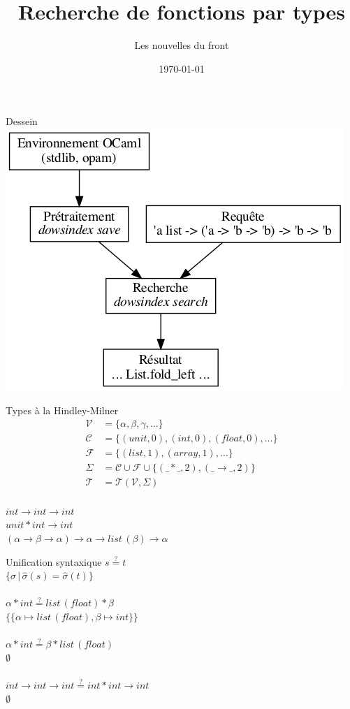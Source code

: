 \documentclass[serif]{beamer}
\title{Recherche de fonctions par types}
\subtitle{Les nouvelles du front}
\date{\today}
\newcommand{\?}{\stackrel{?}{=}}
\begin{document}
\begin{frame}
	\titlepage
\end{frame}


\begin{frame}{Dessein}
	\includegraphics[scale=0.5,center]{graphs/dessein}
\end{frame}


\begin{frame}{Types à la Hindley-Milner}
	\centering
	\large
	\begin{align*}
		\mathscr V &= \{ \alpha, \beta, \gamma, \dots \} \\
		\mathscr C &= \{ (unit, 0), (int, 0), (float, 0), \dots \} \\
		\mathscr F &= \{ (list, 1), (array, 1), \dots \} \\
		\Sigma &= \mathscr C \cup \mathscr F \cup \{ (\_\!*\!\_, 2), (\_\!\rightarrow\!\_, 2) \} \\
		\mathscr T &= \mathscr T (\mathscr V, \Sigma)
	\end{align*}
	~\\
	$int \rightarrow int \rightarrow int$ \\
	$unit * int \rightarrow int$ \\
	$(\alpha \rightarrow \beta \rightarrow \alpha) \rightarrow \alpha \rightarrow list\,(\beta) \rightarrow \alpha$
\end{frame}


\begin{frame}{Unification syntaxique}
	\centering
	\large
	$s \? t$ \\
	$\{ \sigma \,|\, \hat \sigma (s) = \hat \sigma (t) \}$ \\
	~\\
	$\alpha * int \? list\,(float) * \beta$ \\
	$\{ \{ \alpha \mapsto list\,(float), \beta \mapsto int \} \}$ \\
	~\\
	$\alpha * int \? \beta * list\,(float)$ \\
	$\emptyset$ \\
	~\\
	$int \rightarrow int \rightarrow int \? int * int \rightarrow int$ \\
	$\emptyset$
\end{frame}
\end{document}
